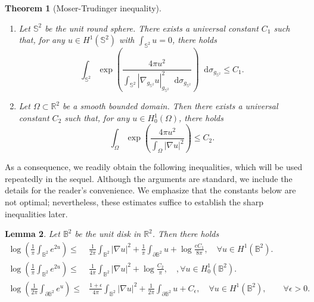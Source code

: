 \documentclass[11pt,a4paper,twoside]{amsart}
\newtheorem{theorem}{Theorem} [section]
\newtheorem{lemma}[theorem]{Lemma}
\newtheorem{sketch proof}{Sketch of the proof}[section]
\newcommand{\dd}{\mathop{}\!\mathrm{d}}
\begin{document}
    \begin{theorem}[Moser-Trudinger inequality]\label{thm. Moser-Trudinger ineq}
\ 
    \begin{enumerate}
        \item Let $\mathbb{S}^2$ be the unit round sphere. There exists a universal constant $C_1$ such that, for any $u\in H^1(\mathbb{S}^2)$ with $\int_{\mathbb{S}^2}u=0$, there holds
        \[
        \int_{\mathbb{S}^2}\exp\left(
        \frac{4\pi u^2}{\int_{\mathbb{S}^2}
        |\nabla_{g_{\mathbb{S}^2}} u|_{g_{\mathbb{S}^2}}^2\dd \sigma_{g_{\mathbb{S}^2}}}
        \right)\dd \sigma_{g_{\mathbb{S}^2}}\leq C_1.
        \]
        \item Let $\Omega\subset \mathbb{R}^2$ be a smooth bounded domain. Then there exists a universal constant $C_2$ such that, for any $u\in H_0^1(\Omega)$, there holds
        \begin{equation}
        \label{eq. Moser-Trudinger on Omega}
            \int_{\Omega}\exp\left(
        \frac{4\pi u^2}{\int_{\Omega}|\nabla u|^2}
        \right)\leq C_2.
        \end{equation}
    \end{enumerate}
\end{theorem}
As a consequence, we readily obtain the following inequalities, which will be used repeatedly in the sequel. Although the arguments are standard, we include the details for the reader's convenience. We emphasize that the constants below are not optimal; nevertheless, these estimates suffice to establish the sharp inequalities later.
\begin{lemma}
    Let $\mathbb{B}^2$ be the unit disk in $\mathbb{R}^2$. Then there holds 
    \begin{align}
        \log\left(
        \frac{1}{\pi}\int_{\mathbb{B}^2}e^{2u}
        \right)
        \leq& \frac{1}{2\pi}\int_{\mathbb{B}^2}
        |\nabla u|^2
        +\frac{1}{\pi}
        \int_{\partial\mathbb{B}^2} u
        +\log\frac{eC_1}{8\pi},\quad 
        \forall u\in H^1(\mathbb{B}^2).
        \label{eq. weak Moser on ball}
        \\[3mm]
        \log\left(
        \frac{1}{\pi}\int_{\mathbb{B}^2}e^{2u}
        \right)
        \leq& \frac{1}{4\pi}\int_{\mathbb{B}^2}
        |\nabla u|^2+\log\frac{C_2}{\pi},\quad,\forall u\in H_0^1(\mathbb{B}^2).
        \label{eq. weak Moser for Dirichlet boundary value}
        \\[3mm]
        \log\left(
        \frac{1}{2\pi}
        \int_{\partial \mathbb{B}^2}e^{u}
        \right)
        \leq& \frac{1+\epsilon}{4\pi}\int_{\mathbb{B}^2}
        |\nabla u|^2
        +\frac{1}{2\pi}
        \int_{\partial\mathbb{B}^2} u
        +C_\epsilon,\quad \forall u\in H^1(\mathbb{B}^2),\qquad \forall \epsilon>0.\label{eq. weak LMO inequality}
    \end{align}
\end{lemma}
\end{document}

